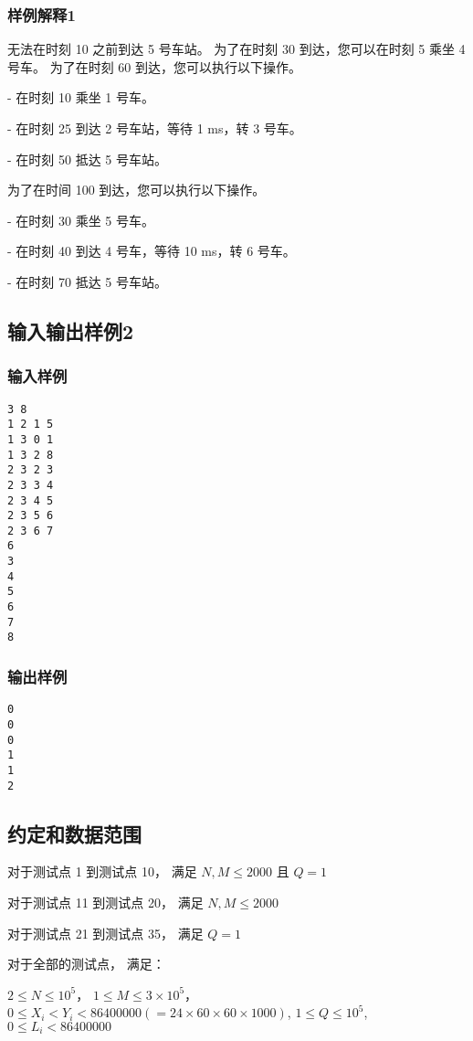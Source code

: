 \documentclass[UTF8]{ctexart}
\begin{document}
\subsubsection{样例解释1}

无法在时刻 10 之前到达 5 号车站。 为了在时刻 30 到达，您可以在时刻 5 乘坐 4 号车。 为了在时刻 60 到达，您可以执行以下操作。

- 在时刻 10 乘坐 1 号车。

- 在时刻 25 到达 2 号车站，等待 1 ms，转 3 号车。

- 在时刻 50 抵达 5 号车站。

为了在时间 100 到达，您可以执行以下操作。

- 在时刻 30 乘坐 5 号车。

- 在时刻 40 到达 4 号车，等待 10 ms，转 6 号车。

- 在时刻 70 抵达 5 号车站。

\subsection{输入输出样例2}
\subsubsection{输入样例}

\begin{lstlisting}
3 8
1 2 1 5
1 3 0 1
1 3 2 8
2 3 2 3
2 3 3 4
2 3 4 5
2 3 5 6
2 3 6 7
6
3
4
5
6
7
8
\end{lstlisting}


\subsubsection{输出样例}

\begin{lstlisting}
0
0
0
1
1
2
\end{lstlisting}

\subsection{约定和数据范围}

对于测试点 1 到测试点 10， 满足 $N,M\le2000$ 且 $Q=1$

对于测试点 11 到测试点 20， 满足 $N,M\le 2000$

对于测试点 21 到测试点 35， 满足 $Q=1$

对于全部的测试点， 满足：

$2\le N\le 10^5$， $1\le M\le 3\times 10^5$，$0\le X_i<Y_i<86400000(=24\times 60 \times 60 \times 1000)$, $1\le Q\le 10^5$, $0\le L_i<86400000$
\end{document}
